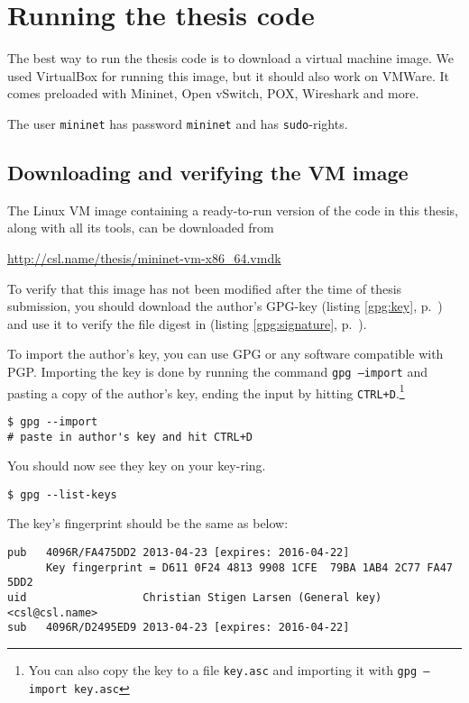 \chapter{Running the thesis code}
\label{chapter:install.vm}

The best way to run the thesis code is to download a virtual machine image.
We used VirtualBox for running this image, but it should
also work on VMWare.  It comes preloaded with
Mininet, Open vSwitch,
  POX,
  Wireshark and more.

The user \texttt{mininet} has password \texttt{mininet} and has
\texttt{sudo}-rights.

\section{Downloading and verifying the VM image}

The Linux VM image containing a ready-to-run version of the
code in this thesis, along with all its tools, can be downloaded from

\begin{center}
  \url{http://csl.name/thesis/mininet-vm-x86_64.vmdk}
  \label{gpg:url}
\end{center}

To verify that this image has not been modified after the time of thesis
submission, you should download the author's GPG-key (listing
\ref{gpg:key}, p.~\pageref{gpg:key}) and use it to verify the file digest
in (listing \ref{gpg:signature}, p.~\pageref{gpg:signature}).

To import the author's key, you can use \ac{GPG} or any software compatible
with PGP.  Importing the key is done by running the command
\texttt{gpg --import} and pasting a copy of the author's key, ending the
input by hitting \texttt{CTRL+D}.\footnote{You can also copy the key to a
  file \texttt{key.asc} and importing it with \texttt{gpg --import key.asc}}
%
\begin{Verbatim}
$ gpg --import
# paste in author's key and hit CTRL+D
\end{Verbatim}
%
You should now see they key on your key-ring.
%
\begin{Verbatim}
$ gpg --list-keys
\end{Verbatim}
%
The key's fingerprint should be the same as below:
%
\begin{lstlisting}[label={gpg:key.fingerprint}]
pub   4096R/FA475DD2 2013-04-23 [expires: 2016-04-22]
      Key fingerprint = D611 0F24 4813 9908 1CFE  79BA 1AB4 2C77 FA47 5DD2
uid                  Christian Stigen Larsen (General key) <csl@csl.name>
sub   4096R/D2495ED9 2013-04-23 [expires: 2016-04-22]
\end{lstlisting}

